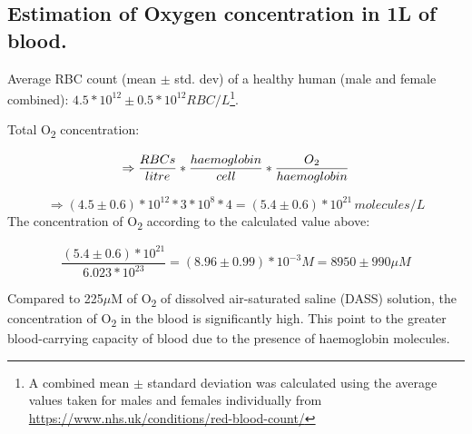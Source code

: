 \documentclass[pdflatex,sn-mathphys]{sn-jnl}%
\theoremstyle{thmstyleone}%
\theoremstyle{thmstyletwo}%
\theoremstyle{thmstylethree}%
\begin{document}
\subsection{Estimation of Oxygen concentration in 1L of blood.}
Average RBC count (mean $\pm$ std. dev) of a healthy human (male and female combined): \(4.5 * 10^{12} {\pm} 0.5 * 10^{12} RBC/L\)\footnote{A combined mean $\pm$ standard deviation was calculated using the average values taken for males and females individually from \href{https://www.nhs.uk/conditions/red-blood-count/}{https://www.nhs.uk/conditions/red-blood-count/}}.

Total O\textsubscript{2} concentration: 

\[\Rightarrow\frac{RBCs}{litre} * \frac{haemoglobin}{cell} * \frac{O\textsubscript{2}}{haemoglobin}\]

\[\Rightarrow(4.5\pm 0.6) * 10^{12} * 3 * 10^{8} * 4 = (5.4\pm 0.6) * 10^{21}\,molecules/L\]
The concentration of O\textsubscript{2} according to the calculated value above:

\[\frac{(5.4\pm 0.6)*10^{21}}{6.023 * 10^{23}} = (8.96\pm0.99) * 10^{-3} M = 8950\pm990 {\mu}M\]\vspace{1mm}


Compared to 225$\mu$M of O\textsubscript{2} of dissolved air-saturated saline (DASS) solution, the concentration of O\textsubscript{2} in the blood is significantly high. This point to the greater blood-carrying capacity of blood due to the presence of haemoglobin molecules.
\end{document}

